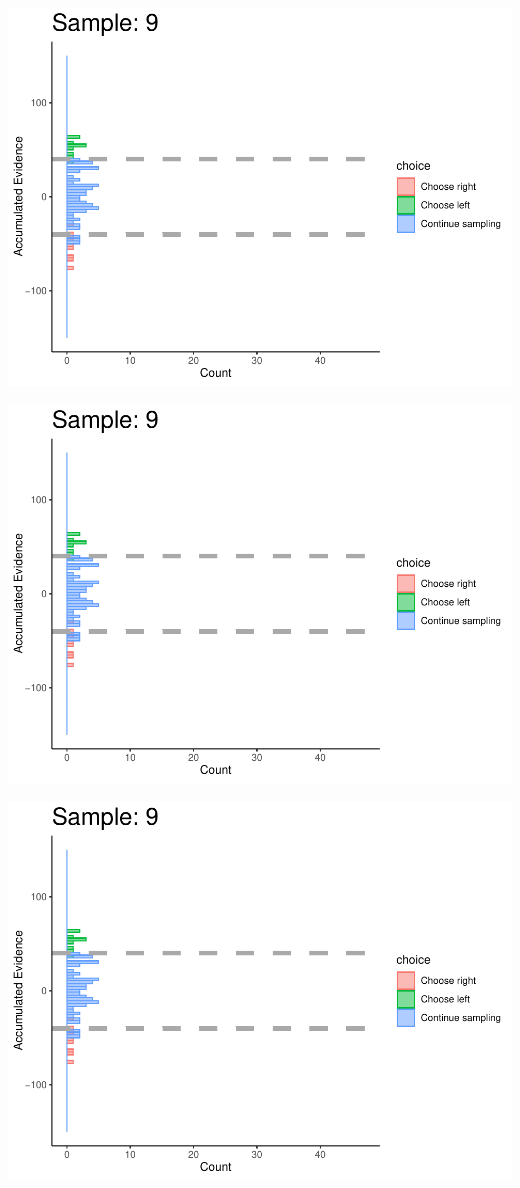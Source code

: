 \documentclass[
]{book}
\begin{document}
\begin{center}\includegraphics[width=0.8\linewidth]{LateNightBayes_files/figure-latex/collapsing_check-83} \end{center}

\begin{center}\includegraphics[width=0.8\linewidth]{LateNightBayes_files/figure-latex/collapsing_check-84} \end{center}

\begin{center}\includegraphics[width=0.8\linewidth]{LateNightBayes_files/figure-latex/collapsing_check-85} \end{center}
\end{document}
